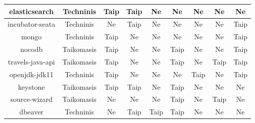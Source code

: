 \begin{figure}[H]
\begin{center}
\begin{tabular}{|c|c|c|c|c|c|c|c|c|}
        elasticsearch                   & Techninis                 & Taip                          & Taip                          & Ne                         & Ne                         & Ne                 & Ne                 & Ne                  \\ \hline
        incubator-seata                 & Techninis                 & Ne                            & Taip                          & Ne                         & Ne                         & Ne                 & Ne                 & Taip                \\ \hline
        mongo                           & Techninis                 & Taip                          & Ne                            & Ne                         & Ne                         & Ne                 & Ne                 & Taip                \\ \hline
        nocodb                          & Taikomasis                & Taip                          & Ne                            & Ne                         & Taip                       & Ne                 & Ne                 & Taip                \\ \hline
        travels-java-api                & Taikomasis                & Taip                          & Ne                            & Ne                         & Taip                       & Ne                 & Taip               & Taip                \\ \hline
        openjdk-jdk11                   & Techninis                 & Taip                          & Ne                            & Ne                         & Ne                         & Taip               & Ne                 & Taip                \\ \hline
        keystone                        & Taikomasis                & Taip                          & Taip                          & Ne                         & Taip                       & Ne                 & Ne                 & Ne                  \\ \hline
        source-wizard                   & Taikomasis                & Ne                            & Ne                            & Ne                         & Taip                       & Ne                 & Taip               & Ne                  \\ \hline
        dbeaver                         & Techninis                 & Ne                            & Taip                          & Taip                       & Taip                       & Ne                 & Ne                 & Ne                  \\ \hline

\end{tabular}
\end{center}
\end{figure}
